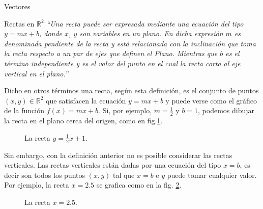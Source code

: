 \documentclass[a4paper,12pt,twoside,spanish]{amsbook}
\theoremstyle{definition}
\theoremstyle{remark}
\newcommand{\R}{\mathbb R}
\begin{document}
\begin{chapter}{Vectores}
\begin{section}{Rectas en $\R^2$}
	\textit{``Una recta puede ser expresada mediante una ecuación del tipo $y = m x + b$, donde $x$, $y$ son variables en un plano. En dicha expresión $m$ es denominada pendiente de la recta y está relacionada con la inclinación que toma la recta respecto a un par de ejes que definen el Plano. Mientras que $b$ es el término independiente y es el valor del punto en el cual la recta corta al eje vertical en el plano.''}
	
	Dicho en otros términos una recta,  según esta definición, es el conjunto de puntos $(x,y) \in \R^2$ que satisfacen la ecuación $y = m x + b$ y puede verse como el gráfico de la función $f(x) = m x + b$. Si, por ejemplo, $m=\frac12$ y $b=1$, podemos dibujar la recta en el plano cerca del origen, como en fig.\ref{fig-recta-funcion}.
	\begin{figure}[h]
		\caption{La recta $y = \frac12x +1$.}
		\label{fig-recta-funcion}
	\end{figure} 
	
	Sin embargo, con la definición anterior no es posible considerar las rectas verticales. Las rectas verticales están dadas por una ecuación del tipo $x= b$,  es decir son todos los puntos $(x,y)$  tal que $x=b$ e $y$ puede tomar cualquier valor. Por ejemplo, la recta $x=2.5$ se  grafica  como en la fig. \ref{fig-recta-vertical}.
	\begin{figure}[h]
		\caption{La recta $x=2.5$.}
		\label{fig-recta-vertical}
	\end{figure} 
	

\end{section}
\end{chapter}
\end{document}
